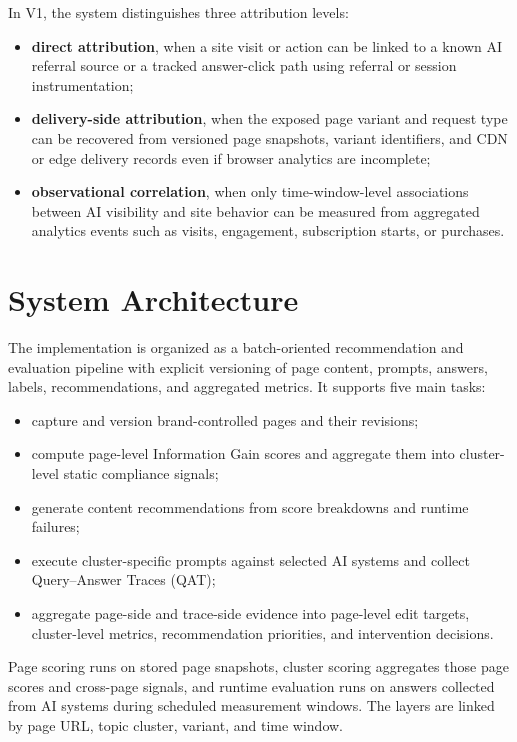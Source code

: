 \documentclass{article}
\begin{document}
In V1, the system distinguishes three attribution levels:
\begin{itemize}
    \item \textbf{direct attribution}, when a site visit or action can be linked to a known AI referral source or a tracked answer-click path using referral or session instrumentation;
    \item \textbf{delivery-side attribution}, when the exposed page variant and request type can be recovered from versioned page snapshots, variant identifiers, and CDN or edge delivery records even if browser analytics are incomplete;
    \item \textbf{observational correlation}, when only time-window-level associations between AI visibility and site behavior can be measured from aggregated analytics events such as visits, engagement, subscription starts, or purchases.
\end{itemize}

\section{System Architecture}

The implementation is organized as a batch-oriented recommendation and evaluation pipeline with explicit versioning of page content, prompts, answers, labels, recommendations, and aggregated metrics. It supports five main tasks:
\begin{itemize}
    \item capture and version brand-controlled pages and their revisions;
    \item compute page-level Information Gain scores and aggregate them into cluster-level static compliance signals;
    \item generate content recommendations from score breakdowns and runtime failures;
    \item execute cluster-specific prompts against selected AI systems and collect Query--Answer Traces (QAT);
    \item aggregate page-side and trace-side evidence into page-level edit targets, cluster-level metrics, recommendation priorities, and intervention decisions.
\end{itemize}

Page scoring runs on stored page snapshots, cluster scoring aggregates those page scores and cross-page signals, and runtime evaluation runs on answers collected from AI systems during scheduled measurement windows. The layers are linked by page URL, topic cluster, variant, and time window.
\end{document}
